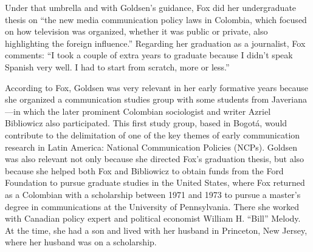 \documentclass{tufte-handout}
\begin{document}
\noindent Under that umbrella and with Goldsen's guidance, Fox did her
undergraduate thesis on ``the new media communication policy laws in
Colombia, which focused on how television was organized, whether it was
public or private, also highlighting the foreign influence.'' Regarding
her graduation as a journalist, Fox comments: ``I took a couple of extra
years to graduate because I didn't speak Spanish very well. I had to
start from scratch, more or less.''

According to Fox, Goldsen was very relevant in her early formative years
because she organized a communication studies group with some students
from Javeriana---in which the later prominent Colombian sociologist and
writer Azriel Bibliowicz also participated. This first study group,
based in Bogotá, would contribute to the delimitation of one of the key
themes of early communication research in Latin America: National
Communication Policies (NCPs). Goldsen was also relevant not only
because she directed Fox's graduation thesis, but also because she
helped both Fox and Bibliowicz to obtain funds from the Ford Foundation
to pursue graduate studies in the United States, where Fox returned as a
Colombian with a scholarship between 1971 and 1973 to pursue a master's
degree in communications at the University of Pennsylvania. There she
worked with Canadian policy expert and political economist William H.
``Bill'' Melody. At the time, she had a son and lived with her husband
in Princeton, New Jersey, where her husband was on a scholarship.
\end{document}
